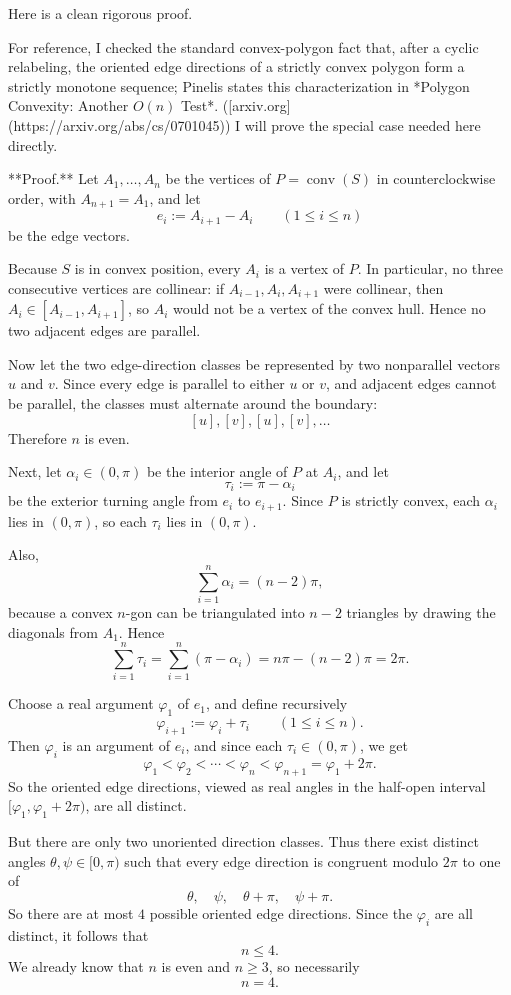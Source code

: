 Here is a clean rigorous proof.

For reference, I checked the standard convex-polygon fact that, after a cyclic relabeling, the oriented edge directions of a strictly convex polygon form a strictly monotone sequence; Pinelis states this characterization in *Polygon Convexity: Another \(O(n)\) Test*. ([arxiv.org](https://arxiv.org/abs/cs/0701045)) I will prove the special case needed here directly.

**Proof.** Let \(A_1,\dots,A_n\) be the vertices of \(P=\operatorname{conv}(S)\) in counterclockwise order, with \(A_{n+1}=A_1\), and let
\[
e_i:=A_{i+1}-A_i \qquad (1\le i\le n)
\]
be the edge vectors.

Because \(S\) is in convex position, every \(A_i\) is a vertex of \(P\). In particular, no three consecutive vertices are collinear: if \(A_{i-1},A_i,A_{i+1}\) were collinear, then \(A_i\in [A_{i-1},A_{i+1}]\), so \(A_i\) would not be a vertex of the convex hull. Hence no two adjacent edges are parallel.

Now let the two edge-direction classes be represented by two nonparallel vectors \(u\) and \(v\). Since every edge is parallel to either \(u\) or \(v\), and adjacent edges cannot be parallel, the classes must alternate around the boundary:
\[
[u],[v],[u],[v],\dots
\]
Therefore \(n\) is even.

Next, let \(\alpha_i\in(0,\pi)\) be the interior angle of \(P\) at \(A_i\), and let
\[
\tau_i:=\pi-\alpha_i
\]
be the exterior turning angle from \(e_i\) to \(e_{i+1}\). Since \(P\) is strictly convex, each \(\alpha_i\) lies in \((0,\pi)\), so each \(\tau_i\) lies in \((0,\pi)\).

Also,
\[
\sum_{i=1}^n \alpha_i=(n-2)\pi,
\]
because a convex \(n\)-gon can be triangulated into \(n-2\) triangles by drawing the diagonals from \(A_1\). Hence
\[
\sum_{i=1}^n \tau_i
=
\sum_{i=1}^n (\pi-\alpha_i)
=
n\pi-(n-2)\pi
=
2\pi.
\]

Choose a real argument \(\varphi_1\) of \(e_1\), and define recursively
\[
\varphi_{i+1}:=\varphi_i+\tau_i \qquad (1\le i\le n).
\]
Then \(\varphi_i\) is an argument of \(e_i\), and since each \(\tau_i\in(0,\pi)\), we get
\[
\varphi_1<\varphi_2<\cdots<\varphi_n<\varphi_{n+1}=\varphi_1+2\pi.
\]
So the oriented edge directions, viewed as real angles in the half-open interval \([\varphi_1,\varphi_1+2\pi)\), are all distinct.

But there are only two unoriented direction classes. Thus there exist distinct angles \(\theta,\psi\in[0,\pi)\) such that every edge direction is congruent modulo \(2\pi\) to one of
\[
\theta,\quad \psi,\quad \theta+\pi,\quad \psi+\pi.
\]
So there are at most \(4\) possible oriented edge directions. Since the \(\varphi_i\) are all distinct, it follows that
\[
n\le 4.
\]
We already know that \(n\) is even and \(n\ge 3\), so necessarily
\[
n=4.
\]

